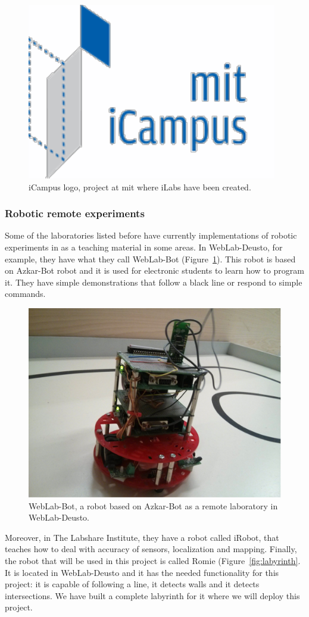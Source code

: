 \begin{figure}[!htbp]
	\centering
	\includegraphics[width=.4\textwidth]{fig/icampus}
	\caption{iCampus logo, project at \acrshort{mit} where iLabs have been created.}
\end{figure}

\subsubsection{Robotic remote experiments}

Some of the laboratories listed before have currently implementations of robotic experiments in
as a teaching material in some areas. In WebLab-Deusto, for example, they have what they call
WebLab-Bot (Figure~\ref{fig:weblab-bot}). This robot is based on Azkar-Bot robot and it is used for
electronic students to learn how to program it. They have simple demonstrations that follow a black
line or respond to simple commands.

\begin{figure}[!htbp]
	\centering
	\includegraphics[width=.4\textwidth]{fig/weblab-bot}
	\caption{WebLab-Bot, a robot based on Azkar-Bot as a remote laboratory in
	WebLab-Deusto.}\label{fig:weblab-bot}
\end{figure}

Moreover, in The Labshare Institute, they have a robot called iRobot, that teaches how to deal with
accuracy of sensors, localization and mapping. Finally, the robot that will be used in this
project is called Romie (Figure~\ref{fig:labyrinth}. It is located in WebLab-Deusto and it has the
needed functionality for this project: it is capable of following a line, it detects walls and it
detects intersections. We have built a complete labyrinth for it where we will deploy this project.

